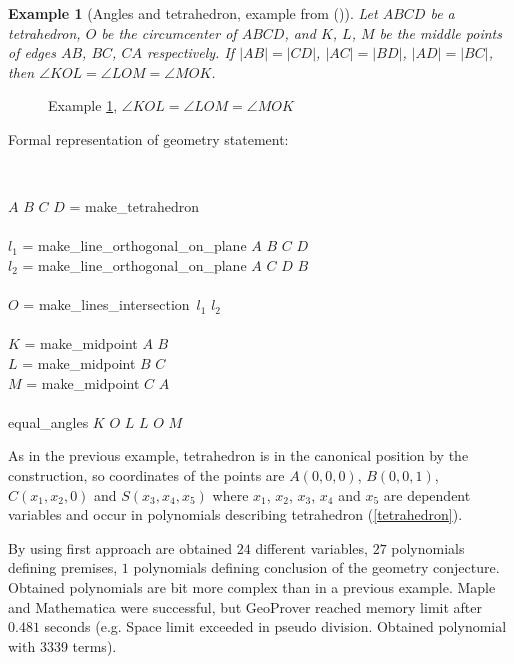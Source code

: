\documentclass[final,1p,times,authoryear]{elsarticle}
\newtheorem{example}[theorem]{Example}
\begin{document}
\begin{example}[Angles and tetrahedron, example from (\cite{shao2016challenging})]\label{drugi}
Let $ABCD$ be a tetrahedron, $O$ be the circumcenter of $ABCD$, and
$K$, $L$, $M$ be the middle points of edges $AB$, $BC$, $CA$
respectively. If $|AB|=|CD|$, $|AC|=|BD|$, $|AD|= |BC|$, then $\angle
KOL = \angle LOM = \angle MOK$.
\end{example}

\begin{figure}[!hb]
\begin{center}

\end{center}
\caption{Example \ref{drugi}, $\angle KOL = \angle LOM = \angle MOK$}
\end{figure}

Formal representation of geometry statement:

\begin{footnotesize}
{\tt
\begin{tabbing}
$A$ $B$ $C$ $D$ = make\_tetrahedron\\
 \\
$l_1$ = make\_line\_orthogonal\_on\_plane $A$ $B$ $C$ $D$ \\
$l_2$ = make\_line\_orthogonal\_on\_plane $A$ $C$ $D$ $B$ \\
 \\
$O$ = make\_lines\_intersection\ $l_1$ $l_2$ \\
 \\
$K$ = make\_midpoint $A$ $B$ \\
$L$ = make\_midpoint $B$ $C$ \\
$M$ = make\_midpoint $C$ $A$ \\
 \\
equal\_angles  $K$ $O$ $L$ $L$ $O$ $M$
\end{tabbing}
}
\end{footnotesize}

As in the previous example, tetrahedron is in the canonical position
by the construction, so coordinates of the points are $A(0, 0, 0)$,
$B(0, 0, 1)$, $C(x_1, x_2, 0)$ and $S(x_3, x_4, x_5)$ where $x_1$,
$x_2$, $x_3$, $x_4$ and $x_5$ are dependent variables and occur in
polynomials describing tetrahedron (\ref{tetrahedron}).

By using first approach are obtained $24$ different variables, $27$
polynomials defining premises, $1$ polynomials defining conclusion of
the geometry conjecture. Obtained polynomials are bit more complex
than in a previous example. Maple and Mathematica were successful, but
GeoProver reached memory limit after $0.481$ seconds (e.g. Space limit
exceeded in pseudo division. Obtained polynomial with 3339 terms).
\end{document}
